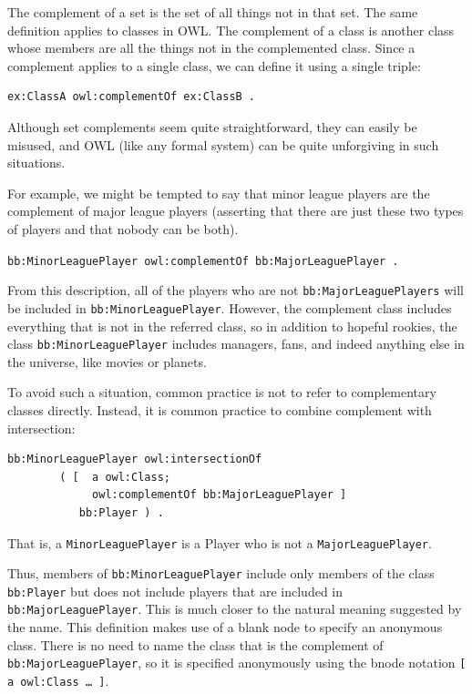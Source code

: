 The complement of a set is the set of all things not in that set. The
same definition applies to classes in OWL. The complement of a class is
another class whose members are all the things not in the complemented
class. Since a complement applies to a single class, we can define it
using a single triple:

\begin{lstlisting}
ex:ClassA owl:complementOf ex:ClassB .
\end{lstlisting}

Although set complements seem quite straightforward, they can easily be
misused, and OWL (like any formal system) can be quite unforgiving in
such situations.

For example, we might be tempted to say that minor league players are
the complement of major league players (asserting that there are just
these two types of players and that nobody can be both).

\texttt{bb:MinorLeaguePlayer owl:complementOf bb:MajorLeaguePlayer .
}

From this description, all of the players who are not
\texttt{bb:MajorLeaguePlayers} will be included in \texttt{bb:MinorLeaguePlayer}. However,
the complement class includes everything that is not in the referred
class, so in addition to hopeful rookies, the class \texttt{bb:MinorLeaguePlayer}
includes managers, fans, and indeed anything else in the universe, like
movies or planets.

To avoid such a situation, common practice is not to refer to
complementary classes directly. Instead, it is common practice to
combine complement with intersection:

\begin{lstlisting}
bb:MinorLeaguePlayer owl:intersectionOf
        ( [  a owl:Class;
             owl:complementOf bb:MajorLeaguePlayer ]
           bb:Player ) .
\end{lstlisting}

That is, a \texttt{MinorLeaguePlayer} is a Player who is not a \texttt{MajorLeaguePlayer}.

Thus, members of \texttt{bb:MinorLeaguePlayer} include only members of the class
\texttt{bb:Player} but does not include players that are included in
\texttt{bb:MajorLeaguePlayer}. This is much closer to the natural meaning
suggested by the name. This definition makes use of a blank node  to specify
an anonymous class. There is no need to name the class that is the
complement of \texttt{bb:MajorLeaguePlayer}, so it is specified anonymously using
the bnode notation \texttt{{[} a owl:Class \ldots{} {]}}.

